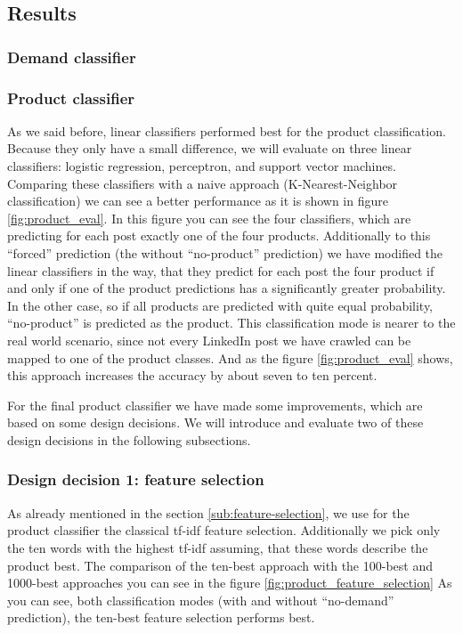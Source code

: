 \subsection{Results}
\label{sub:results}

\subsubsection{Demand classifier}
\label{ssub:demand_classifier}


\subsubsection{Product classifier}
\label{ssub:product_classifier}

As we said before, linear classifiers performed best for the product classification.
Because they only have a small difference, we will evaluate on three linear classifiers: logistic regression, perceptron, and support vector machines.
Comparing these classifiers with a naive approach (K-Nearest-Neighbor classification) we can see a better performance as it is shown in figure \ref{fig:product_eval}.
In this figure you can see the four classifiers, which are predicting for each post exactly one of the four products.
Additionally to this ``forced'' prediction (the without ``no-product'' prediction) we have modified the linear classifiers in the way, that they predict for each post the four product if and only if one of the product predictions has a significantly greater probability.
In the other case, so if all products are predicted with quite equal probability, ``no-product'' is predicted as the product.
This classification mode is nearer to the real world scenario, since not every LinkedIn post we have crawled can be mapped to one of the product classes.
And as the figure \ref{fig:product_eval} shows, this approach increases the accuracy by about seven to ten percent.

For the final product classifier we have made some improvements, which are based on some design decisions.
We will introduce and evaluate two of these design decisions in the following subsections.

\subsubsection{Design decision 1: feature selection}
As already mentioned in the section \ref{sub:feature-selection}, we use for the product classifier the classical tf-idf feature selection.
Additionally we pick only the ten words with the highest tf-idf assuming, that these words describe the product best.
The comparison of the ten-best approach with the 100-best and 1000-best approaches you can see in the figure \ref{fig:product_feature_selection}
As you can see, both classification modes (with and without ``no-demand'' prediction), the ten-best feature selection performs best.

